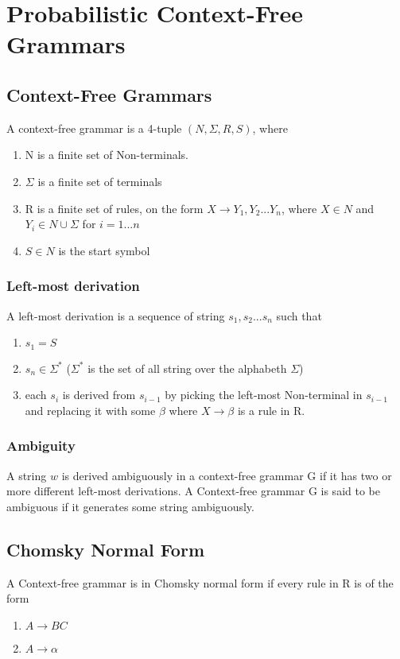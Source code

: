 \section{Probabilistic Context-Free Grammars}


\subsection{Context-Free Grammars}
A context-free grammar is a 4-tuple $(N, \Sigma, R, S)$, where
\begin{enumerate}
\item N is a finite set of Non-terminals.   
\item $\Sigma$ is a finite set of terminals 
\item R is a finite set of rules, on the form $X \rightarrow Y_1,Y_2 ... Y_n$,
where $X \in N$ and $Y_i \in N \cup \Sigma$ for $i = 1 ... n$
\item $S \in N$ is the start symbol
\end{enumerate}
\cite[p.104]{sipser}
\cite[p.1]{collins}

\subsubsection{Left-most derivation}
A left-most derivation is a sequence of string $s_1, s_2 ... s_n$ such that
\begin{enumerate}
\item $s_1 = S$
\item $s_n \in \Sigma^*$ ($\Sigma^*$ is the set of all string over the alphabeth $\Sigma$)
\item each $s_i$ is derived from $s_{i-1}$ by picking the left-most Non-terminal in $s_{i-1}$ and replacing it with some $\beta$ where $X \rightarrow \beta$  is a rule in R.
\end{enumerate} 
\cite[p.2]{collins}

\subsubsection{Ambiguity}
A string $w$ is derived ambiguously in a context-free grammar G if it has two or
more different left-most derivations.
A Context-free grammar G is said to be ambiguous if it generates some string ambiguously.
\cite[p.108]{sipser}

\subsection{Chomsky Normal Form}
A Context-free grammar is in Chomsky normal form if every rule in R is of the form
\begin{enumerate}
\item $A \rightarrow BC$
\item $A \rightarrow \alpha$
\end{enumerate}

